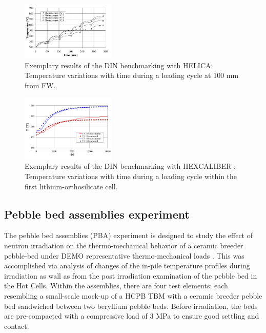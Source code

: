 \begin{figure}[t!]
\begin{center}
\includegraphics[width=0.4\textwidth]{chapters/figures/Fig-8}
\caption{Exemplary results of the DIN benchmarking with HELICA: Temperature variations with time during a loading cycle at 100 mm from FW\cite{DellOrco:2007hc}.}
\label{fig:DIN_HELICA}
\end{center}
\end{figure}


 \begin{figure}[t!]
\begin{center}
\includegraphics[width=0.4\textwidth]{chapters/figures/Fig-9}
\caption{Exemplary results of the DIN benchmarking with HEXCALIBER : Temperature variations with time during a loading cycle within the first lithium-orthosilicate cell\cite{DellOrco:2010zr}.}
\label{fig:DIN_HEX}
\end{center}
\end{figure}



\subsection{Pebble bed assemblies experiment}
The pebble bed assemblies (PBA) experiment is designed to study the effect of neutron irradiation on the thermo-mechanical behavior of a ceramic breeder pebble-bed under DEMO representative thermo-mechanical loads \cite{Magielsen2007}. This was accomplished via analysis of changes of the in-pile temperature profiles during irradiation as wall as from the post irradiation examination of the pebble bed in the Hot Cells. Within the assemblies, there are four test elements; each resembling a small-scale mock-up of a HCPB TBM with a ceramic breeder pebble bed sandwiched between two beryllium pebble beds. Before irradiation, the beds are pre-compacted with a compressive load of 3 MPa to ensure good settling and contact.  

